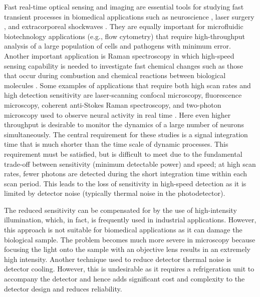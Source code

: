 Fast real-time optical sensing and imaging are essential tools for studying fast transient processes in biomedical applications such as neuroscience \cite{ohki2005functional,golshani2009internally}, laser surgery \cite{slade2000complete}, and extracorporeal shockwaves \cite{delius2002twenty,riehle1987principles}. They are equally important for microfluidic biotechnology applications (e.g., flow cytometry) \cite{goda2009serial,squires2005microfluidics,watson2004introduction} that require high-throughput analysis of a large population of cells and pathogens with minimum error. Another important application is Raman spectroscopy in which high-speed sensing capability is needed to investigate fast chemical changes such as those that occur during combustion \cite{hult2007high} and chemical reactions between biological molecules \cite{epstein1998introduction,petty2006spatiotemporal,siesler2008near}. Some examples of applications that require both high scan rates and high detection sensitivity are laser-scanning confocal microscopy, fluorescence microscopy, coherent anti-Stokes Raman spectroscopy, and two-photon microscopy used to observe neural activity in real time \cite{diaspro2001confocal}. Here even higher throughput is desirable to monitor the dynamics of a large number of neurons simultaneously.
The central requirement for these studies is a signal integration time that is much shorter than the time scale of dynamic processes. This requirement must be satisfied, but is difficult to meet due to the fundamental trade-off between sensitivity (minimum detectable power) and speed; at high scan rates, fewer photons are detected during the short integration time within each scan period. This leads to the loss of sensitivity in high-speed detection as it is limited by detector noise (typically thermal noise in the photodetector).

The reduced sensitivity can be compensated for by the use of high-intensity illumination, which, in fact, is frequently used in industrial applications. However, this approach is not suitable for biomedical applications as it can damage the biological sample. The problem becomes much more severe in microscopy because focusing the light onto the sample with an objective lens results in an extremely high intensity. Another technique used to reduce detector thermal noise is detector cooling. However, this is undesirable as it requires a refrigeration unit to accompany the detector and hence adds significant cost and complexity to the detector design and reduces reliability.

